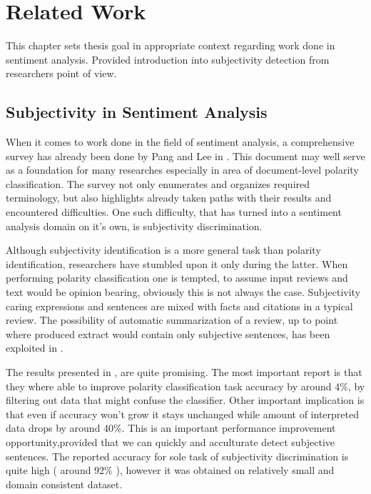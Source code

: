 \chapter{Related Work}

This chapter sets thesis goal in appropriate context regarding work done in sentiment analysis. Provided introduction into subjectivity detection from 
researchers point of view.

\section{ Subjectivity in Sentiment Analysis }

When it comes to work done in the field of sentiment analysis, a comprehensive survey has already been done by Pang and Lee in \cite{PangLee2008}. This
document may well serve as a foundation for many researches especially in area of document-level polarity classification. The survey not only enumerates
and organizes required terminology, but also highlights already taken paths with their results and encountered difficulties. 
One such difficulty, that has turned into a sentiment analysis domain on it's own, is subjectivity discrimination. 

Although subjectivity identification is a more general task than polarity identification, researchers have stumbled upon it only during the latter.
When performing polarity classification one is tempted, to assume input reviews and text would be opinion bearing, obviously this is not always the case.
Subjectivity caring expressions and sentences are mixed with facts and citations in a typical review. The possibility of automatic summarization of a review, up to point
where produced extract would contain only subjective sentences, has been exploited in \cite{PangLee2004}. 

The results presented in \cite{PangLee2004}, are quite promising. The most important report is that they where able to improve polarity classification 
task accuracy by around 4\%, by filtering out data that might confuse the classifier. Other important implication is that even if accuracy won't grow 
it stays unchanged while amount of interpreted data drops by around 40\%. This is an important performance improvement opportunity,provided that we can 
quickly and acculturate detect subjective sentences. The reported accuracy for sole task of subjectivity discrimination is  quite high ( around 92\% ),
however it was obtained on relatively small and domain consistent dataset. 

